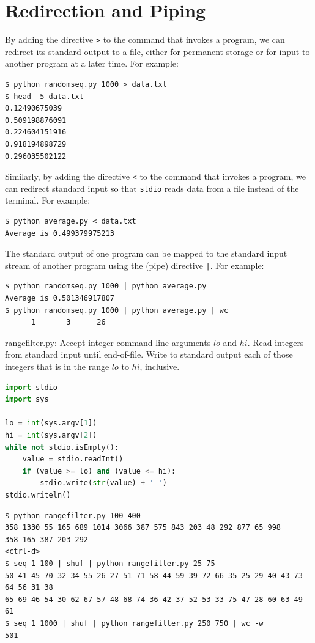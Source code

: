 \documentclass[8pt,a4paper,compress,handout]{beamer}
\begin{document}
\section{Redirection and Piping}
\begin{frame}[fragile]
By adding the directive \lstinline{>} to the command that invokes a program, we can redirect its standard output to a file, either for permanent storage or for input to another program at a later time. For example: 
\begin{lstlisting}[language={}]
$ python randomseq.py 1000 > data.txt
$ head -5 data.txt 
0.12490675039
0.509198876091
0.224604151916
0.918194898729
0.296035502122
\end{lstlisting}

\bigskip

Similarly, by adding the directive \lstinline{<} to the command that invokes a program, we can redirect standard input so that \lstinline{stdio} reads data from a file instead of the terminal. For example:  
\begin{lstlisting}[language={}]
$ python average.py < data.txt
Average is 0.499379975213
\end{lstlisting}

\bigskip

The standard output of one program can be mapped to the standard input stream of another program using the (pipe) directive \lstinline{|}. For example:  
\begin{lstlisting}[language={}]
$ python randomseq.py 1000 | python average.py 
Average is 0.501346917807
$ python randomseq.py 1000 | python average.py | wc
      1       3      26
\end{lstlisting}
\end{frame}

\begin{frame}[fragile]
\begin{framed}
\tiny rangefilter.py: Accept integer command-line arguments $lo$ and $hi$. Read integers from standard input until end-of-file. Write to standard output each of those integers that is in the range $lo$ to $hi$, inclusive.
\end{framed}

\begin{lstlisting}[language=Python]
import stdio
import sys

lo = int(sys.argv[1])
hi = int(sys.argv[2])
while not stdio.isEmpty():
    value = stdio.readInt()
    if (value >= lo) and (value <= hi):
        stdio.write(str(value) + ' ')
stdio.writeln()
\end{lstlisting}

\begin{lstlisting}[language={}]
$ python rangefilter.py 100 400
358 1330 55 165 689 1014 3066 387 575 843 203 48 292 877 65 998
358 165 387 203 292
<ctrl-d>
$ seq 1 100 | shuf | python rangefilter.py 25 75
50 41 45 70 32 34 55 26 27 51 71 58 44 59 39 72 66 35 25 29 40 43 73 64 56 31 38 
65 69 46 54 30 62 67 57 48 68 74 36 42 37 52 53 33 75 47 28 60 63 49 61 
$ seq 1 1000 | shuf | python rangefilter.py 250 750 | wc -w
501
\end{lstlisting}
\end{frame}
\end{document}
